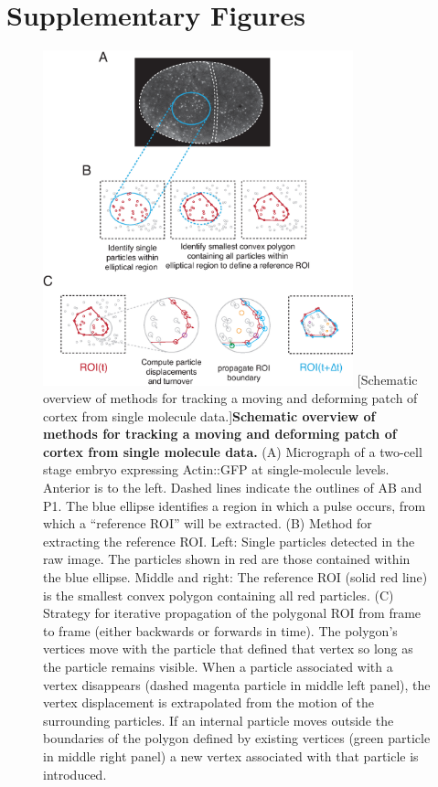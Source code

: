 \documentclass{ucetd}
\begin{document}
{{{{\begin{table}[htbp]
\end{table}

\newpage





\section{Supplementary Figures}

\begin{figure}[!htbp]
\centering
\includegraphics[width=0.8\textwidth]{Figure2-10}
[Schematic overview of methods for tracking a moving and deforming patch of cortex from single molecule data.]{\textbf{Schematic overview of methods for tracking a moving and deforming patch of cortex from single molecule data.} (A) Micrograph of a two-cell stage embryo expressing Actin::GFP at single-molecule levels. Anterior is to the left.  Dashed lines indicate the outlines of AB and P1.  The blue ellipse identifies a region in which a pulse occurs, from which a “reference ROI” will be extracted. (B) Method for extracting the reference ROI. Left:  Single particles detected in the raw image.  The particles shown in red are those contained within the blue ellipse.  Middle and right: The reference ROI (solid red line) is the smallest convex polygon containing all red particles. (C) Strategy for iterative propagation of the polygonal ROI from frame to frame (either backwards or forwards in time).  The polygon's vertices move with the particle that defined that vertex so long as the particle remains visible. When a particle associated with a vertex disappears (dashed magenta particle in middle left panel), the vertex displacement is extrapolated from the motion of the surrounding particles. If an internal particle moves outside the boundaries of the polygon defined by existing vertices (green particle in middle right panel) a new vertex associated with that particle is introduced.}
\end{figure}




}}}}
\end{document}
